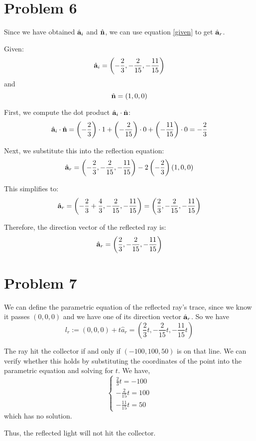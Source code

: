 \documentclass[12pt,a4paper]{article}
\begin{document}
    \section*{Problem 6}
    \begin{solution}
     Since we have obtained $\hat{\mathbf{a}}_i$ and $\hat{\mathbf{n}}$, we can use equation \ref{given} to get $\hat{\mathbf{a}}_r$.
     
        Given:
\[
\hat{\mathbf{a}}_i = \left( -\frac{2}{3}, -\frac{2}{15}, -\frac{11}{15} \right)
\]
and
\[
\hat{\mathbf{n}} = (1, 0, 0)
\]

First, we compute the dot product \(\hat{\mathbf{a}}_i \cdot \hat{\mathbf{n}}\):
\[
\hat{\mathbf{a}}_i \cdot \hat{\mathbf{n}} = \left( -\frac{2}{3} \right) \cdot 1 + \left( -\frac{2}{15} \right) \cdot 0 + \left( -\frac{11}{15} \right) \cdot 0 = -\frac{2}{3}
\]

Next, we substitute this into the reflection equation:
\[
\hat{\mathbf{a}}_r = \left( -\frac{2}{3}, -\frac{2}{15}, -\frac{11}{15} \right) - 2 \left( -\frac{2}{3} \right) (1, 0, 0)
\]

This simplifies to:
\[
\hat{\mathbf{a}}_r = \left( -\frac{2}{3} + \frac{4}{3}, -\frac{2}{15}, -\frac{11}{15} \right) = \left( \frac{2}{3}, -\frac{2}{15}, -\frac{11}{15} \right)
\]

Therefore, the direction vector of the reflected ray is:
\[
\hat{\mathbf{a}}_r = \left( \frac{2}{3}, -\frac{2}{15}, -\frac{11}{15} \right)
\]
    \end{solution}

\section*{Problem 7}
\begin{solution}
We can define the parametric equation of the reflected ray's trace, since we know it passes $(0,0,0)$ and we have one of its direction vector $\hat{\mathbf{a}}_r$.
So we have 
$$
l_{r} := ( 0,0,0) +t\hat{a}_{r} = \left( \frac{2}{3}t, -\frac{2}{15}t, -\frac{11}{15}t \right)
$$

The ray hit the collector if and only if $(-100,100,50)$ is on that line. We can verify whether this holds by substituting the coordinates of the point into the parametric equation and solving for \( t \).
We have,
$$
\begin{cases}
\frac{2}{3}t = -100 \\
-\frac{2}{15}t = 100 \\
-\frac{11}{15}t = 50
\end{cases}
$$
which has no solution.

Thus, the reflected light will not hit the collector.
\end{solution}
\end{document}
